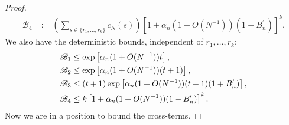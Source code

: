 \documentclass{article}
\newcommand{\1}[1]{\mathbbm{1}_{#1}}
\begin{document}
\begin{proof}
\begin{align}
\mathscr{B}_4 &:= \left( \sum_{s\in \{r_1,\dots,r_k\} } c_N(s) \right)
\left[ 1 + \alpha_n (1+O(N^{-1})) (1 + B_n^\prime) \right]^k . \label{eq:106}
\end{align}
We also have the deterministic bounds, independent of $r_1,\dots,r_k$:
\begin{align}
\mathscr{B}_1 &\leq \exp\left[ \alpha_n (1+O(N^{-1})) t \right] , \notag\\
\mathscr{B}_2 &\leq \exp\left[ \alpha_n (1+O(N^{-1})) (t+1) \right] , \notag\\
\mathscr{B}_3 &\leq (t+1) \exp\left[ \alpha_n (1+O(N^{-1})) (t+1) (1+B_n^\prime) \right] , \notag\\
\mathscr{B}_4 &\leq k \left[ 1 + \alpha_n (1+O(N^{-1})) (1 + B_n^\prime) \right]^k . \label{eq:107}
\end{align}
Now we are in a position to bound the cross-terms.


\end{proof}
\end{document}
